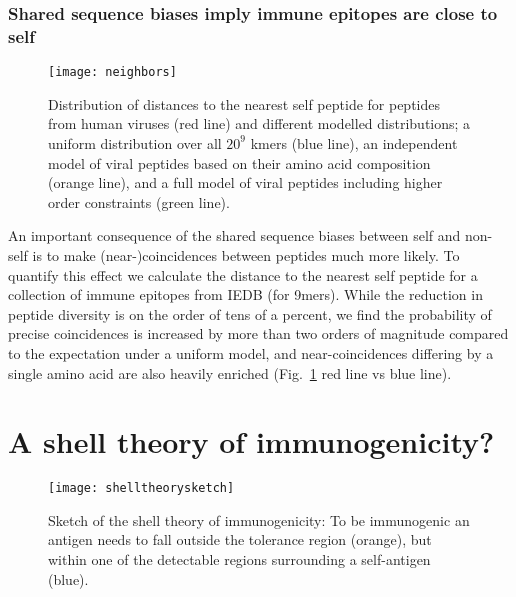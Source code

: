 \documentclass[superscriptaddress,twocolumn,pre]{revtex4}
\newcommand{\<}{\langle}
\renewcommand{\>}{\rangle}
\begin{document}


\subsubsection{Shared sequence biases imply immune epitopes are close to self}

\begin{figure}
    \texttt{[image: neighbors]}
    \caption{Distribution of distances to the nearest self peptide for peptides from human viruses (red line) and different modelled distributions; a uniform distribution over all $20^9$ kmers (blue line), an independent model of viral peptides based on their amino acid composition (orange line), and a full model of viral peptides including higher order constraints (green line).
    \label{figneighbors}
    }
\end{figure}

An important consequence of the shared sequence biases between self and non-self is to make (near-)coincidences between peptides much more likely. To quantify this effect we calculate the distance to the nearest self peptide for a collection of immune epitopes from IEDB (for 9mers). While the reduction in peptide diversity is on the order of tens of a percent, we find the probability of precise coincidences is increased by more than two orders of magnitude compared to the expectation under a uniform model, and near-coincidences differing by a single amino acid are also heavily enriched (Fig.~\ref{figneighbors} red line vs blue line).

\section{A shell theory of immunogenicity?}

\begin{figure}
    \texttt{[image: shelltheorysketch]}
    \caption{Sketch of the shell theory of immunogenicity: To be immunogenic an antigen needs to fall outside the tolerance region (orange), but within one of the detectable regions surrounding a self-antigen (blue).
    \label{figshelltheorysketch}
    }
\end{figure}
\end{document}
